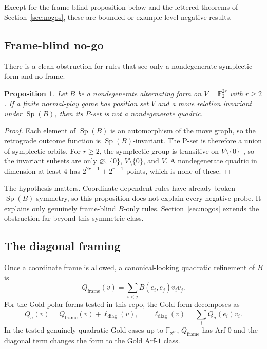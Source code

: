 \documentclass[11pt]{article}
\theoremstyle{plain}
\newtheorem{proposition}{Proposition}
\theoremstyle{definition}
\newcommand{\F}{\mathbb{F}}
\newcommand{\Sp}{\operatorname{Sp}}
\begin{document}
Except for the frame-blind proposition below and the lettered theorems of
Section~\ref{sec:nogos}, these are bounded or example-level negative results.

\subsection{Frame-blind no-go}

There is a clean obstruction for rules that see only a nondegenerate
symplectic form and no frame.

\begin{proposition}\label{prop:nogo}
Let $B$ be a nondegenerate alternating form on $V=\F_2^{2r}$ with $r\geq 2$.
If a finite normal-play game has position set $V$ and a move relation invariant
under $\Sp(B)$, then its $P$-set is not a nondegenerate quadric.
\end{proposition}

\begin{proof}
Each element of $\Sp(B)$ is an automorphism of the move graph, so
the retrograde outcome function is $\Sp(B)$-invariant. The P-set
is therefore a union of symplectic orbits. For $r\geq2$, the symplectic group is
transitive on $V\setminus\{0\}$~\cite{Taylor}, so the invariant subsets are only
$\varnothing$, $\{0\}$, $V\setminus\{0\}$, and $V$. A nondegenerate quadric in
dimension at least $4$ has $2^{2r-1}\pm2^{r-1}$ points, which is none of these.
\end{proof}

The hypothesis matters. Coordinate-dependent rules have already broken
$\Sp(B)$ symmetry, so this proposition does not explain every
negative probe. It explains only genuinely frame-blind $B$-only rules.
Section~\ref{sec:nogos} extends the obstruction far beyond this symmetric
class.

\subsection{The diagonal framing}\label{sec:framing}

Once a coordinate frame is allowed, a canonical-looking quadratic refinement of
$B$ is
\[
  Q_{\mathrm{frame}}(v)=\sum_{i<j}B(e_i,e_j)v_i v_j.
\]
For the Gold polar forms tested in this repo, the Gold form decomposes as
\[
  Q_a(v)=Q_{\mathrm{frame}}(v)+\ell_{\mathrm{diag}}(v),
  \qquad
  \ell_{\mathrm{diag}}(v)=\sum_i Q_a(e_i)v_i.
\]
In the tested genuinely quadratic Gold cases up to $\F_{2^{16}}$,
$Q_{\mathrm{frame}}$ has Arf $0$ and the diagonal term changes the form to the
Gold Arf-$1$ class.
\end{document}
